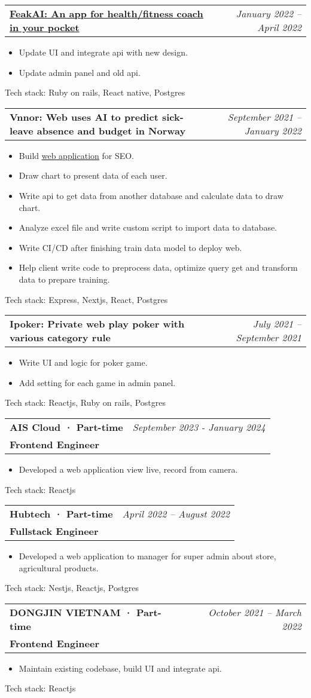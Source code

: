 \documentclass[letterpaper,11pt]{article}
\makeatletter
\newcommand{\resumeItem}[1]{
  \item\small{
    {#1 \vspace{-2pt}}
  }
}
\newcommand{\resumeSubheadingWithoutProject}[4]{
  \vspace{-2pt}\item
    \begin{tabular*}{0.97\textwidth}[t]{l@{\extracolsep{\fill}}r}
      \textbf{#1} & \textit{#2} \\
      \textbf{\small#3} & \textit{\small #4} \\
    \end{tabular*}\vspace{-7pt}
}
\newcommand{\resumeSubheadingProject}[2]{
  \vspace{-2pt}\item
    \begin{tabular*}{0.97\textwidth}[t]{l@{\extracolsep{\fill}}r}
      \textbf{\small#1} & \textit{\small #2} \\
    \end{tabular*}\vspace{-7pt}
}
\newcommand{\resumeSubheadingProjectWithLink}[4]{
  \vspace{-2pt}\item
    \begin{tabular*}{0.97\textwidth}[t]{l@{\extracolsep{\fill}}r}
      \href{#1}{\textbf{\underline{#2}:{#3}}} & \textit{\small #4} \\
    \end{tabular*}\vspace{-7pt}
}
\newcommand{\resumeLink}[2]{
  \href{#1}{\underline{#2}}
}
\newcommand{\resumeSubSubheading}[2]{
    \item
    \begin{tabular*}{0.97\textwidth}{l@{\extracolsep{\fill}}r}
      \textit{\small#1} & \textit{\small #2} \\
    \end{tabular*}\vspace{-7pt}
}
\newcommand{\resumeSubHeadingListEnd}{\end{itemize}}
\newcommand{\resumeItemListStart}{\begin{itemize}}
\newcommand{\resumeItemListEnd}{\end{itemize}\vspace{-5pt}}
\makeatother
\begin{document}
\resumeSubheadingProjectWithLink
{https://play.google.com/store/apps/details?id=ai.feak\&hl=en}
{FeakAI}
{ An app for health/fitness coach in your pocket}{January 2022 -- April 2022}
\resumeItemListStart
\resumeItem{ Update UI and integrate api with new design.}
\resumeItem{ Update admin panel and old api.}
\resumeItemListEnd
{Tech stack:}{ Ruby on rails, React native, Postgres}

\resumeSubheadingProject
{Vnnor: Web uses AI to predict sick-leave absence and budget in Norway}{September 2021 -- January 2022}
\resumeItemListStart
\resumeItem{ Build \resumeLink{https://www.synplan.ai/}{web application} for SEO.}
\resumeItem{ Draw chart to present data of each user.}
\resumeItem{ Write api to get data from another database and calculate data to draw chart.}
\resumeItem{ Analyze excel file and write custom script to import data to database.}
\resumeItem{ Write CI/CD after finishing train data model to deploy web.}
\resumeItem{ Help client write code to preprocess data, optimize query get and transform data to prepare training.}
\resumeItemListEnd
{Tech stack:}{ Express, Nextjs, React, Postgres}

\resumeSubheadingProject
{Ipoker: Private web play poker with various category rule}{July 2021 -- September 2021}
\resumeItemListStart
\resumeItem{ Write UI and logic for poker game.}
\resumeItem{ Add setting for each game in admin panel.}
\resumeItemListEnd
{Tech stack:}{ Reactjs, Ruby on rails, Postgres}


\resumeSubheadingWithoutProject
{AIS Cloud · Part-time}{September 2023 - January 2024}
{Frontend Engineer}{}
\resumeItemListStart
\resumeItem{Developed a web application view live, record from camera.}
\resumeItemListEnd
{Tech stack:}{ Reactjs }

\resumeSubheadingWithoutProject
{Hubtech · Part-time}{April 2022 -- August 2022}
{Fullstack Engineer}{}
\resumeItemListStart
\resumeItem{Developed a web application to manager for super admin about store, agricultural products.}
\resumeItemListEnd
{Tech stack:}{ Nestjs, Reactjs, Postgres}

\resumeSubheadingWithoutProject
{DONGJIN VIETNAM · Part-time}{October 2021 -- March 2022}
{Frontend Engineer}{}
\resumeItemListStart
\resumeItem{ Maintain existing codebase, build UI and integrate api.}
\resumeItemListEnd
{Tech stack:}{ Reactjs}
\end{document}
